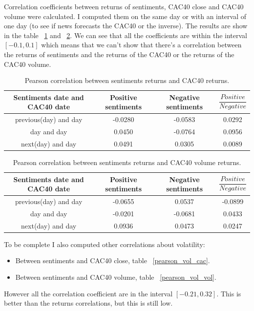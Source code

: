 \documentclass[12pt]{report}
\begin{document}
			Correlation coefficients between returns of sentiments, CAC40 close and CAC40 volume were calculated. I computed them on the same day or with an interval of one day (to see if news forecasts the CAC40 or the inverse). The results are show in the table ~\ref{pearson_cac} and ~\ref{pearson_volume}. We can see that all the coefficients are within the interval $[-0.1, 0.1]$ which means that we can't show that there's a correlation between the returns of sentiments and the returns of the CAC40 or the returns of the CAC40 volume.
			
			\begin{table}
			\begin{tabular}{|c | c | c | c|}
				\hline
				Sentiments date and CAC40 date & Positive sentiments & Negative sentiments & $\dfrac{Positive}{Negative}$\\
				\hline
				previous(day) and day & -0.0280 & -0.0583 & 0.0292\\
				\hline
				day and day & 0.0450 & -0.0764 & 0.0956\\
				\hline
				next(day) and day & 0.0491 & 0.0305 & 0.0089\\
				\hline
			\end{tabular}
			
			\caption{Pearson correlation between sentiments returns and CAC40 returns.\label{pearson_cac}}
			\end{table}

			\begin{table}
			\begin{tabular}{|c | c | c | c|}
				\hline
				Sentiments date and CAC40 date & Positive sentiments & Negative sentiments & $\dfrac{Positive}{Negative}$\\
				\hline
				previous(day) and day & -0.0655 & 0.0537 & -0.0899\\
				\hline
				day and day & -0.0201 & -0.0681 & 0.0433\\
				\hline
				next(day) and day & 0.0936 & 0.0473 & 0.0247\\
				\hline
			\end{tabular}
			
			\caption{Pearson correlation between sentiments returns and CAC40 volume returns.\label{pearson_volume}}
			\end{table}

		To be complete I also computed other correlations about volatility:
			\begin{itemize}
				\item Between sentiments and CAC40 close, table ~\ref{pearson_vol_cac}.
				\item Between sentiments and CAC40 volume, table ~\ref{pearson_vol_vol}.
			\end{itemize}
			However all the correlation coefficient are in the interval $[-0.21, 0.32]$. This is better than the returns correlations, but this is still low.
\end{document}
